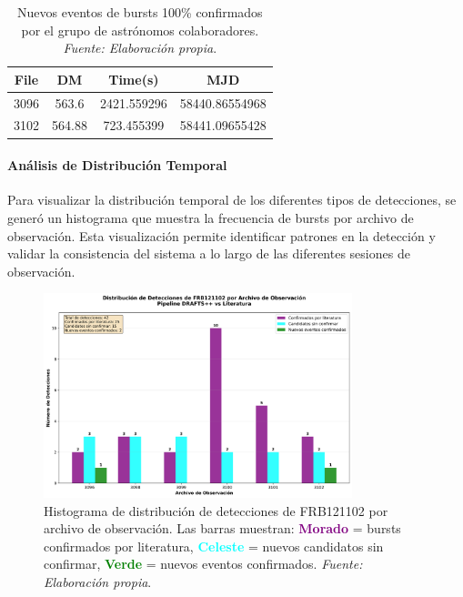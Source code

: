 \begin{table}[H]
    \centering
    \caption{Nuevos eventos de bursts 100\% confirmados por el grupo de astrónomos colaboradores. \textit{Fuente: Elaboración propia}.}
    \label{tab:new_confirmed_bursts}
    \begin{tabular}{|c|c|c|c|}
        \hline
        \textbf{File} & \textbf{DM} & \textbf{Time(s)} & \textbf{MJD} \\
        \hline
        3096 & 563.6 & 2421.559296 & 58440.86554968 \\
        3102 & 564.88 & 723.455399 & 58441.09655428 \\
        \hline
    \end{tabular}
\end{table}

\paragraph{Análisis de Distribución Temporal}

Para visualizar la distribución temporal de los diferentes tipos de detecciones, se generó un histograma que muestra la frecuencia de bursts por archivo de observación. Esta visualización permite identificar patrones en la detección y validar la consistencia del sistema a lo largo de las diferentes sesiones de observación.

\begin{figure}[H]
    \centering
    \includegraphics[width=0.8\textwidth]{figures/frb121102_detection_histogram.png}
    \caption{Histograma de distribución de detecciones de FRB121102 por archivo de observación. Las barras muestran: \textcolor{purple}{\textbf{Morado}} = bursts confirmados por literatura, \textcolor{cyan}{\textbf{Celeste}} = nuevos candidatos sin confirmar, \textcolor{green}{\textbf{Verde}} = nuevos eventos confirmados. \textit{Fuente: Elaboración propia}.}
    \label{fig:frb121102_histogram}
\end{figure}

